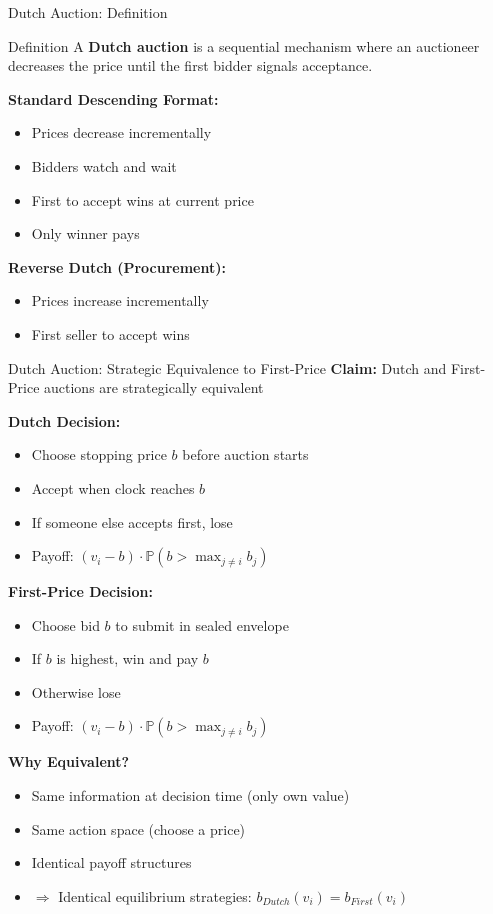 \documentclass[xcolor={x11names}, aspectratio=169 ]{beamer}
\begin{document}
\begin{frame}{Dutch Auction: Definition}
\begin{block}{Definition}
A \textbf{Dutch auction} is a sequential mechanism where an auctioneer decreases the price until the first bidder signals acceptance.
\end{block}

\textbf{Standard Descending Format:}
\begin{itemize}
\item Prices decrease incrementally
\item Bidders watch and wait
\item First to accept wins at current price
\item Only winner pays
\end{itemize}

\textbf{Reverse Dutch (Procurement):}
\begin{itemize}
\item Prices increase incrementally
\item First seller to accept wins
\end{itemize}
\end{frame}

\begin{frame}{Dutch Auction: Strategic Equivalence to First-Price}
\textbf{Claim:} Dutch and First-Price auctions are strategically equivalent

\textbf{Dutch Decision:}
\begin{itemize}
  \item Choose stopping price $b$ before auction starts
  \item Accept when clock reaches $b$
  \item If someone else accepts first, lose
  \item Payoff: $(v_i - b) \cdot \mathbb{P}(b > \max_{j \neq i} b_j)$
\end{itemize}

\textbf{First-Price Decision:}
\begin{itemize}
  \item Choose bid $b$ to submit in sealed envelope
  \item If $b$ is highest, win and pay $b$
  \item Otherwise lose
  \item Payoff: $(v_i - b) \cdot \mathbb{P}(b > \max_{j \neq i} b_j)$
\end{itemize}

\textbf{Why Equivalent?}
\begin{itemize}
  \item Same information at decision time (only own value)
  \item Same action space (choose a price)
  \item Identical payoff structures
  \item $\Rightarrow$ Identical equilibrium strategies: $b_{Dutch}(v_i) = b_{First}(v_i)$
\end{itemize}
\end{frame}
\end{document}
